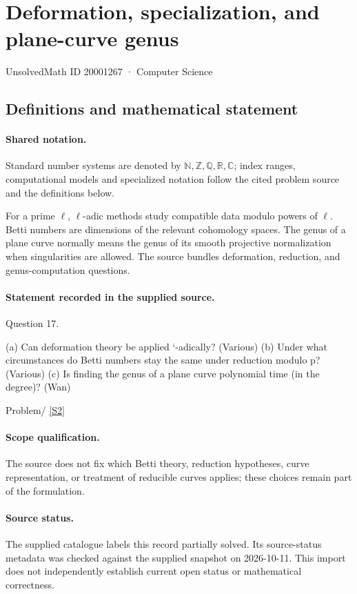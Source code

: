 \documentclass[11pt]{article}
\newcommand{\sref}[2]{\hyperlink{source:#1:#2}{[S#2]}}
\begin{document}
\setcounter{section}{20001266}
\section{Deformation, specialization, and plane-curve genus}\label{20001267}
{\small\sffamily UnsolvedMath ID 20001267 · Computer Science}
\subsection{Definitions and mathematical statement}

\paragraph{Shared notation.}Standard number systems are denoted by $\mathbb N,\mathbb Z,\mathbb Q,\mathbb R,\mathbb C$; index ranges, computational models and specialized notation follow the cited problem source and the definitions below.


For a prime $\ell$, $\ell$-adic methods study compatible data modulo powers of $\ell$. Betti numbers are dimensions of the relevant cohomology spaces. The genus of a plane curve normally means the genus of its smooth projective normalization when singularities are allowed. The source bundles deformation, reduction, and genus-computation questions.
\paragraph{Statement recorded in the supplied source.}
Question 17.

(a) Can deformation theory be applied `-adically? (Various) (b) Under what circumstances do Betti numbers stay the same under reduction modulo p?(Various) (c) Is finding the genus of a plane curve polynomial time (in the degree)? (Wan)

Problem/ \sref{20001267}{2}
\paragraph{Scope qualification.}
The source does not fix which Betti theory, reduction hypotheses, curve representation, or treatment of reducible curves applies; these choices remain part of the formulation.
\paragraph{Source status.}
The supplied catalogue labels this record partially solved. Its source-status metadata was checked against the supplied snapshot on 2026-10-11. This import does not independently establish current open status or mathematical correctness.
\end{document}
